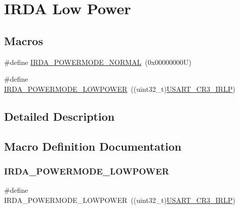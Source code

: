 \hypertarget{group___i_r_d_a___low___power}{}\section{I\+R\+DA Low Power}
\label{group___i_r_d_a___low___power}
\subsection*{Macros}
\begin{DoxyCompactItemize}
\item 
\#define \hyperlink{group___i_r_d_a___low___power_ga28e06e6f6e185f066d492e2d3cdb7e89}{I\+R\+D\+A\+\_\+\+P\+O\+W\+E\+R\+M\+O\+D\+E\+\_\+\+N\+O\+R\+M\+AL}~(0x00000000\+U)
\item 
\#define \hyperlink{group___i_r_d_a___low___power_ga261eafd053023b5935b50767058c804b}{I\+R\+D\+A\+\_\+\+P\+O\+W\+E\+R\+M\+O\+D\+E\+\_\+\+L\+O\+W\+P\+O\+W\+ER}~((uint32\+\_\+t)\hyperlink{group___peripheral___registers___bits___definition_ga22af8d399f1adda62e31186f0309af80}{U\+S\+A\+R\+T\+\_\+\+C\+R3\+\_\+\+I\+R\+LP})
\end{DoxyCompactItemize}


\subsection{Detailed Description}


\subsection{Macro Definition Documentation}
\mbox{\label{group___i_r_d_a___low___power_ga261eafd053023b5935b50767058c804b}} 
\subsubsection{\texorpdfstring{I\+R\+D\+A\+\_\+\+P\+O\+W\+E\+R\+M\+O\+D\+E\+\_\+\+L\+O\+W\+P\+O\+W\+ER}{IRDA\_POWERMODE\_LOWPOWER}}
{\footnotesize\ttfamily \#define I\+R\+D\+A\+\_\+\+P\+O\+W\+E\+R\+M\+O\+D\+E\+\_\+\+L\+O\+W\+P\+O\+W\+ER~((uint32\+\_\+t)\hyperlink{group___peripheral___registers___bits___definition_ga22af8d399f1adda62e31186f0309af80}{U\+S\+A\+R\+T\+\_\+\+C\+R3\+\_\+\+I\+R\+LP})}

